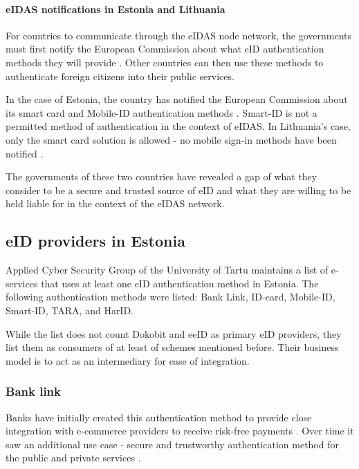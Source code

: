 \paragraph{eIDAS notifications in Estonia and Lithuania}

For countries to communicate through the eIDAS node network, the governments must first notify the European Commission about what eID authentication methods they will provide \cite{eulaw-eidas}. Other countries can then use these methods to authenticate foreign citizens into their public services.

In the case of Estonia, the country has notified the European Commission about its smart card and Mobile-ID authentication methods \cite{eulaw-eidas-notified}. Smart-ID is not a permitted method of authentication in the context of eIDAS. In Lithuania's case, only the smart card solution is allowed - no mobile sign-in methods have been notified \cite{eulaw-eidas-notified}.

The governments of these two countries have revealed a gap of what they consider to be a secure and trusted source of eID and what they are willing to be held liable for in the context of the eIDAS network.

\subsection{eID providers in Estonia}

Applied Cyber Security Group of the University of Tartu maintains a list of e-services \cite{ut-eidinestonia} that uses at least one eID authentication method in Estonia. The following authentication methods were listed: Bank Link, ID-card, Mobile-ID, Smart-ID, TARA, and HarID.

While the list does not count Dokobit and eeID as primary eID providers, they list them as consumers of at least of schemes mentioned before. Their business model is to act as an intermediary for ease of integration.

\subsubsection{Bank link}

Banks have initially created this authentication method to provide close integration with e-commerce providers to receive risk-free payments \cite{kerem2003internet}. Over time it saw an additional use case - secure and trustworthy authentication method for the public and private services \cite{sebbanklink}. 

